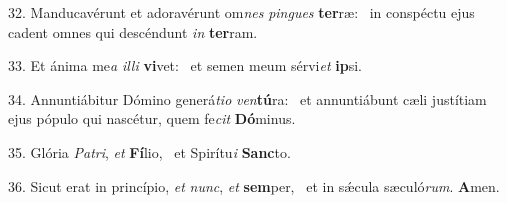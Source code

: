 32. Manducavérunt et adoravérunt om\textit{nes} \textit{pin}\textit{gues} \textbf{ter}ræ: \ast\  in conspéctu ejus cadent omnes qui descéndunt \textit{in} \textbf{ter}ram.\

33. Et ánima me\textit{a} \textit{il}\textit{li} \textbf{vi}vet: \ast\  et semen meum sérvi\textit{et} \textbf{ip}si.\

34. Annuntiábitur Dómino generá\textit{ti}\textit{o} \textit{ven}\textbf{tú}ra: \ast\  et annuntiábunt cæli justítiam ejus pópulo qui nascétur, quem fe\textit{cit} \textbf{Dó}minus.\

35. Glória \textit{Pa}\textit{tri}, \textit{et} \textbf{Fí}lio, \ast\  et Spirítu\textit{i} \textbf{Sanc}to.\

36. Sicut erat in princípio, \textit{et} \textit{nunc}, \textit{et} \textbf{sem}per, \ast\  et in sǽcula sæculó\textit{rum}. \textbf{A}men.\

